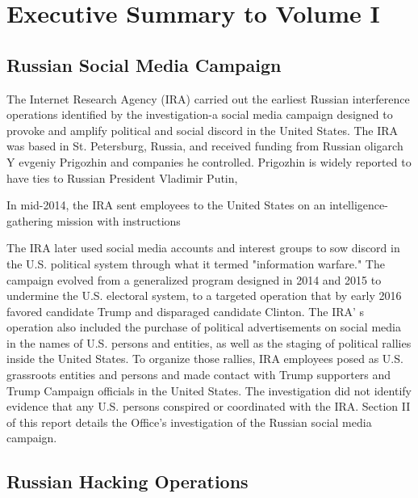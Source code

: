 \documentclass{article}
\begin{document}
\section{Executive Summary to Volume I}

\subsection{Russian Social Media Campaign}

The Internet Research Agency (IRA) carried out the earliest Russian interference operations identified by the investigation-a  social media campaign designed to provoke and amplify political and social discord in the United States. The IRA was based in St. Petersburg, Russia, and received funding from Russian oligarch Y evgeniy Prigozhin and companies he controlled. Prigozhin is widely reported to have ties to Russian President Vladimir Putin, 

In mid-2014, the IRA sent employees to the United States on an intelligence-gathering mission with instructions 

The IRA later used social media accounts and interest groups to sow discord in the U.S. political system through what it  termed "information warfare." The campaign evolved from a generalized program designed in 2014 and 2015 to undermine the U.S.  electoral system, to a targeted operation that by early 2016 favored candidate Trump and disparaged candidate Clinton. The IRA' s operation also included the purchase of political advertisements on social media in the names of U.S. persons and entities, as well as the staging of political rallies inside the United States. To organize those rallies, IRA employees posed as U.S. grassroots entities and persons and made contact with Trump supporters and Trump Campaign officials in the United States. The investigation did not identify evidence that any U.S. persons conspired or coordinated with the IRA. Section II of this report details the Office's investigation of the Russian social media campaign.

\subsection{Russian Hacking Operations}
\end{document}
